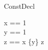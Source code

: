 \begin{zsection}
  \SECTION ConstDecl
\end{zsection}

\begin{axdef}
  x == 1\\
  y == 1\\
  z == \power \nat
\where
  x \in \{y\} \in z
\end{axdef} 
